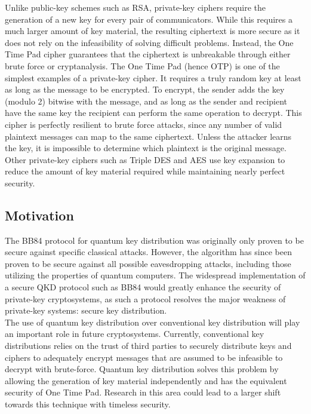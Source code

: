 \documentclass[conference]{IEEEtran}
\begin{document}
Unlike public-key schemes such as RSA, private-key ciphers require the generation of a new key for every pair of communicators. While this requires a much larger amount of key material, the resulting ciphertext is more secure as it does not rely on the infeasibility of solving difficult problems. Instead, the One Time Pad cipher guarantees that the ciphertext is unbreakable through either brute force or cryptanalysis. The One Time Pad (hence OTP) is one of the simplest examples of a private-key cipher. It requires a truly random key at least as long as the message to be encrypted. To encrypt, the sender adds the key (modulo 2) bitwise with the message, and as long as the sender and recipient have the same key the recipient can perform the same operation to decrypt. This cipher is perfectly resilient to brute force attacks, since any number of valid plaintext messages can map to the same ciphertext. Unless the attacker learns the key, it is impossible to determine which plaintext is the original message. Other private-key ciphers such as Triple DES and AES use key expansion to reduce the amount of key material required while maintaining nearly perfect security.\\




\subsection{Motivation}
The BB84 protocol for quantum key distribution was originally only proven to be secure against specific classical attacks. However, the algorithm has since been proven to be secure against all possible eavesdropping attacks, including those utilizing the properties of quantum computers\cite{Shor}. The widespread implementation of a secure QKD protocol such as BB84 would greatly enhance the security of private-key cryptosystems, as such a protocol resolves the major weakness of private-key systems: secure key distribution.\\

The use of quantum key distribution over conventional key distribution will play an important role in future cryptosystems. Currently, conventional key distributions relies on the trust of third parties to securely distribute keys and ciphers to adequately encrypt messages that are assumed to be infeasible to decrypt with brute-force. Quantum key distribution solves this problem by allowing the generation of key material independently and has the equivalent security of One Time Pad. Research in this area could lead to a larger shift towards this technique with timeless security.\\
\end{document}
